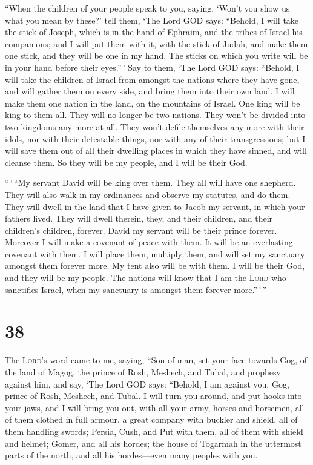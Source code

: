  ``When the children of your people speak to you, saying,
`Won't you show us what you mean by these?'  tell them,
`The Lord GOD says: ``Behold, I will take the stick of Joseph, which is
in the hand of Ephraim, and the tribes of Israel his companions; and I
will put them with it, with the stick of Judah, and make them one stick,
and they will be one in my hand.  The sticks on which you
write will be in your hand before their eyes.''\,'  Say
to them, `The Lord GOD says: ``Behold, I will take the children of
Israel from amongst the nations where they have gone, and will gather
them on every side, and bring them into their own land. 
I will make them one nation in the land, on the mountains of Israel. One
king will be king to them all. They will no longer be two nations. They
won't be divided into two kingdoms any more at all.  They
won't defile themselves any more with their idols, nor with their
detestable things, nor with any of their transgressions; but I will save
them out of all their dwelling places in which they have sinned, and
will cleanse them. So they will be my people, and I will be their God.

 ``\,`\,``My servant David will be king over them. They
all will have one shepherd. They will also walk in my ordinances and
observe my statutes, and do them.  They will dwell in the
land that I have given to Jacob my servant, in which your fathers lived.
They will dwell therein, they, and their children, and their children's
children, forever. David my servant will be their prince forever.
 Moreover I will make a covenant of peace with them. It
will be an everlasting covenant with them. I will place them, multiply
them, and will set my sanctuary amongst them forever more.
 My tent also will be with them. I will be their God, and
they will be my people.  The nations will know that I am
the \textsc{Lord} who sanctifies Israel, when my sanctuary is amongst
them forever more.''\,'\,''

\hypertarget{section-37}{%
\section{38}\label{section-37}}

 The \textsc{Lord}'s word came to me, saying,
 ``Son of man, set your face towards Gog, of the land of
Magog, the prince of Rosh, Meshech, and Tubal, and prophesy against him,
 and say, `The Lord GOD says: ``Behold, I am against you,
Gog, prince of Rosh, Meshech, and Tubal.  I will turn you
around, and put hooks into your jaws, and I will bring you out, with all
your army, horses and horsemen, all of them clothed in full armour, a
great company with buckler and shield, all of them handling swords;
 Persia, Cush, and Put with them, all of them with shield
and helmet;  Gomer, and all his hordes; the house of
Togarmah in the uttermost parts of the north, and all his hordes---even
many peoples with you.

